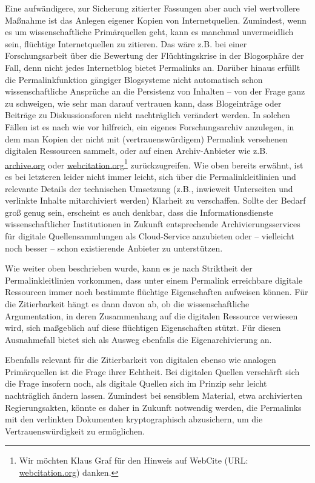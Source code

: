 \documentclass[12pt, a4paper]{article}
\begin{document}
Eine aufwändigere, zur Sicherung zitierter Fassungen aber auch viel wertvollere
Maßnahme ist das Anlegen eigener Kopien von
Internetquellen. Zumindest, wenn es um wissenschaftliche Primärquellen
geht, kann es manchmal unvermeidlich sein, flüchtige Internetquellen
zu zitieren. Das wäre z.B. bei einer Forschungsarbeit über die
Bewertung der Flüchtingskrise in der Blogosphäre der Fall, denn nicht
jedes Internetblog bietet Permalinks an. Darüber hinaus erfüllt die
Permalinkfunktion gängiger Blogsysteme nicht automatisch schon
wissenschaftliche Ansprüche an die Persistenz von Inhalten -- von der
Frage ganz zu schweigen, wie sehr man darauf vertrauen kann, dass
Blogeinträge oder Beiträge zu Diskussionsforen nicht nachträglich
verändert werden. In solchen Fällen ist es nach wie vor hilfreich, ein
eigenes Forschungsarchiv anzulegen, in dem man Kopien der nicht mit
(vertrauenswürdigem) Permalink versehenen digitalen Ressourcen
sammelt, oder auf einen Archiv-Anbieter wie
z.B. \href{http://archive.org}{archive.org} oder
\href{http://webcitation.org}{webcitation.org}\footnote{Wir möchten
  Klaus Graf für den Hinweis auf WebCite (URL:
  \href{http://webcitation.org}{webcitation.org}) danken.}
zurückzugreifen. Wie oben bereits erwähnt, ist es bei letzteren leider
nicht immer leicht, sich über die Permalinkleitlinien und relevante
Details der technischen Umsetzung (z.B., inwieweit Unterseiten und
verlinkte Inhalte mitarchiviert werden) Klarheit zu
verschaffen. Sollte der Bedarf groß genug sein, erscheint es auch
denkbar, dass die Informationsdienste wissenschaftlicher Institutionen
in Zukunft entsprechende Archivierungsservices für digitale
Quellensammlungen als Cloud-Service anzubieten oder -- vielleicht noch
besser -- schon existierende Anbieter zu unterstützen.

Wie weiter oben beschrieben wurde, kann es je nach Striktheit der
Permalinkleitlinien vorkommen, dass unter einem Permalink
erreichbare digitale Ressourcen immer noch bestimmte flüchtige
Eigenschaften aufweisen können. Für die Zitierbarkeit hängt es dann
davon ab, ob die wissenschaftliche Argumentation, in deren
Zusammenhang auf die digitalen Ressource verwiesen wird, sich
maßgeblich auf diese flüchtigen Eigenschaften stützt. Für diesen
Ausnahmefall bietet sich als Ausweg ebenfalls die Eigenarchivierung
an.

Ebenfalls relevant für die Zitierbarkeit von digitalen ebenso wie
analogen Primärquellen ist die Frage ihrer Echtheit. Bei digitalen
Quellen verschärft sich die Frage insofern noch, als digitale Quellen
sich im Prinzip sehr leicht nachträglich ändern lassen. Zumindest bei
sensiblem Material, etwa archivierten Regierungsakten, könnte es daher
in Zukunft notwendig werden, die Permalinks mit den verlinkten
Dokumenten kryptographisch abzusichern, um die Vertrauenswürdigkeit zu
ermöglichen.
\end{document}
